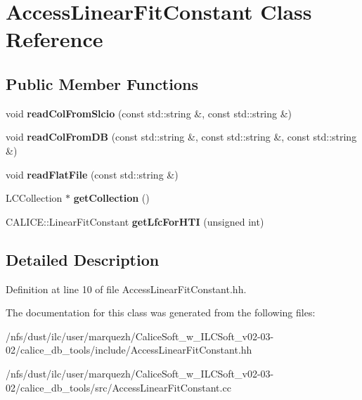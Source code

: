 \section{Access\-Linear\-Fit\-Constant Class Reference}
\label{classAccessLinearFitConstant}
\subsection*{Public Member Functions}
\begin{DoxyCompactItemize}
\item 
void {\bfseries read\-Col\-From\-Slcio} (const std\-::string \&, const std\-::string \&)\label{classAccessLinearFitConstant_a805a5cbb159cef2f00ceeaab17e9fc19}

\item 
void {\bfseries read\-Col\-From\-D\-B} (const std\-::string \&, const std\-::string \&, const std\-::string \&)\label{classAccessLinearFitConstant_abbfcac4378262f7e4973158b51f8e6d0}

\item 
void {\bfseries read\-Flat\-File} (const std\-::string \&)\label{classAccessLinearFitConstant_a4824fd131694e5581399a9ccab9b37fd}

\item 
L\-C\-Collection $\ast$ {\bfseries get\-Collection} ()\label{classAccessLinearFitConstant_a57488d4a170cd28190051a489011973d}

\item 
C\-A\-L\-I\-C\-E\-::\-Linear\-Fit\-Constant {\bfseries get\-Lfc\-For\-H\-T\-I} (unsigned int)\label{classAccessLinearFitConstant_a0780f95b7fa86315d2df23e2faeefc92}

\end{DoxyCompactItemize}


\subsection{Detailed Description}


Definition at line 10 of file Access\-Linear\-Fit\-Constant.\-hh.



The documentation for this class was generated from the following files\-:\begin{DoxyCompactItemize}
\item 
/nfs/dust/ilc/user/marquezh/\-Calice\-Soft\-\_\-w\-\_\-\-I\-L\-C\-Soft\-\_\-v02-\/03-\/02/calice\-\_\-db\-\_\-tools/include/Access\-Linear\-Fit\-Constant.\-hh\item 
/nfs/dust/ilc/user/marquezh/\-Calice\-Soft\-\_\-w\-\_\-\-I\-L\-C\-Soft\-\_\-v02-\/03-\/02/calice\-\_\-db\-\_\-tools/src/Access\-Linear\-Fit\-Constant.\-cc\end{DoxyCompactItemize}
